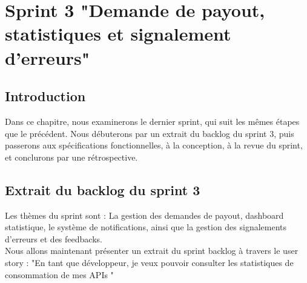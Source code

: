 \chapter{Sprint 3 "Demande de payout, statistiques et signalement d'erreurs"}

\section*{Introduction}
Dans ce chapitre, nous examinerons le dernier sprint, qui suit les mêmes étapes que le précédent. Nous débuterons par un extrait du backlog du sprint 3, puis passerons aux spécifications fonctionnelles, à la conception, à la revue du sprint, et conclurons par une rétrospective.

\section{ Extrait du backlog du sprint 3}
Les thèmes du sprint sont : La gestion des demandes de payout, dashboard statistique, le système de notifications, ainsi que la gestion des signalements d'erreurs et des feedbacks. \\
Nous allons maintenant présenter un extrait du sprint backlog à travers le user story : "En tant que développeur, je veux pouvoir consulter les statistiques de consommation de mes APIs "


